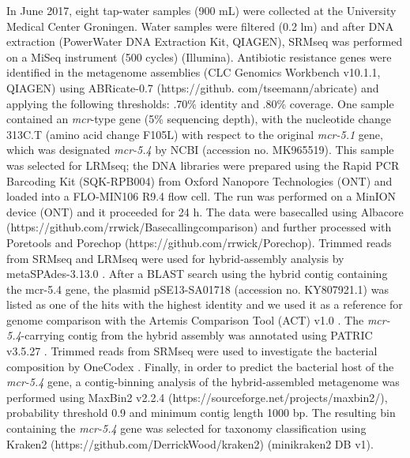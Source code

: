 In June 2017, eight tap-water samples (900 mL) were collected at the University Medical Center Groningen. 
Water samples were filtered (0.2 lm) and after DNA extraction (PowerWater DNA Extraction Kit, QIAGEN), SRMseq was performed on a MiSeq instrument (500 cycles) (Illumina). 
Antibiotic resistance genes were identified in the metagenome assemblies (CLC Genomics Workbench v10.1.1, QIAGEN) using ABRicate-0.7 (https://github.
com/tseemann/abricate) and applying the following thresholds:
.70\% identity and .80\% coverage. 
One sample contained an \textit{mcr}-type gene (5\% sequencing depth), with the nucleotide change 313C.T (amino acid change F105L) with respect to the original
\textit{mcr-5.1} gene, which was designated \textit{mcr-5.4} by NCBI (accession
no. MK965519). 
This sample was selected for LRMseq; the DNA libraries were prepared using the Rapid PCR Barcoding Kit (SQK-RPB004) from Oxford Nanopore Technologies (ONT) and
loaded into a FLO-MIN106 R9.4 flow cell. 
The run was performed on a MinION device (ONT) and it proceeded for 24 h. 
The data were basecalled using Albacore (https://github.com/rrwick/Basecallingcomparison) and further processed with Poretools \citep{loman_poretools_2014} and Porechop (https://github.com/rrwick/Porechop). 
Trimmed reads from SRMseq and LRMseq were used for hybrid-assembly analysis by
metaSPAdes-3.13.0 \citep{nurk_metaspades_2017}. 
After a BLAST search using the hybrid contig containing the mcr-5.4 gene, the plasmid pSE13-SA01718 (accession no. KY807921.1) was listed as one of the hits with the highest identity and we used it as a reference for genome comparison with the Artemis Comparison Tool (ACT) v1.0
\citep{carver_act_2005}. 
The \textit{mcr-5.4}-carrying contig from the hybrid assembly was annotated using PATRIC v3.5.27 \citep{wattam_improvements_2017}. 
Trimmed reads from SRMseq were used to investigate the bacterial composition by OneCodex \citep{minot_one_2015}. 
Finally, in order to predict the bacterial host of the \textit{mcr-5.4} gene, a contig-binning analysis of the hybrid-assembled metagenome was performed using MaxBin2 v2.2.4 (https://sourceforge.net/projects/maxbin2/), probability
threshold 0.9 and minimum contig length 1000 bp. 
The resulting bin containing the \textit{mcr-5.4} gene was selected for taxonomy classification using Kraken2 (https://github.com/DerrickWood/kraken2)
(minikraken2 DB v1).

